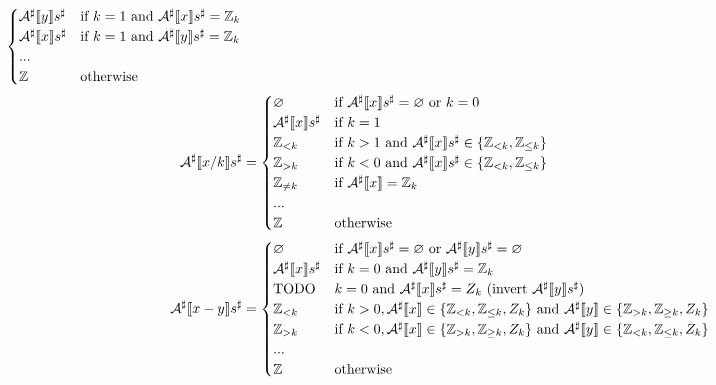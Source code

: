 \begin{exercise}
\begin{align*}
\begin{cases}
            \Asharp{y} s^\sharp & \text{if } k = 1 \text{ and } \Asharp{x} s^\sharp = \Z_k \\
            \Asharp{x} s^\sharp & \text{if } k = 1 \text{ and } \Asharp{y} s^\sharp = \Z_k \\
            ... \\
            \Z & \text{otherwise}
        \end{cases} \\
        \Asharp{x / k} s^\sharp &= \begin{cases}
            \varnothing & \text{if } \Asharp{x} s^\sharp = \varnothing \text{ or } k = 0 \\
            \Asharp{x} s^\sharp & \text{if } k = 1 \\
            \Z_{< k} & \text{if } k > 1 \text{ and } \Asharp{x} s^\sharp \in \{ \Z_{< k}, \Z_{\leq k} \} \\
            \Z_{> k} & \text{if } k < 0 \text{ and } \Asharp{x} s^\sharp \in \{ \Z_{< k}, \Z_{\leq k} \} \\
            \Z_{\neq k} & \text{if } \Asharp{x} = \Z_k \\
            ... \\
            \Z & \text{otherwise}
        \end{cases} \\
        \Asharp{x - y} s^\sharp &= \begin{cases}
            \varnothing & \text{if } \Asharp{x} s^\sharp = \varnothing \text{ or } \Asharp{y} s^\sharp = \varnothing \\
            \Asharp{x} s^\sharp & \text{if } k = 0 \text{ and } \Asharp{y} s^\sharp = \Z_k \\
            \text{TODO} & \text{$k = 0$ and $\Asharp{x} s^\sharp = Z_k$ (invert $\Asharp{y} s^\sharp$)} \\
            \Z_{< k} & \text{if } k > 0, \Asharp{x} \in \{ \Z_{< k}, \Z_{\leq k}, Z_k \} \text{ and } \Asharp{y} \in \{ \Z_{> k}, \Z_{\geq k}, Z_k \} \\
            \Z_{> k} & \text{if } k < 0, \Asharp{x} \in \{ \Z_{> k}, \Z_{\geq k}, Z_k \} \text{ and } \Asharp{y} \in \{ \Z_{< k}, \Z_{\leq k}, Z_k \} \\
            ... \\
            \Z & \text{otherwise}
        \end{cases} \\
    \end{align*}
\end{exercise}
